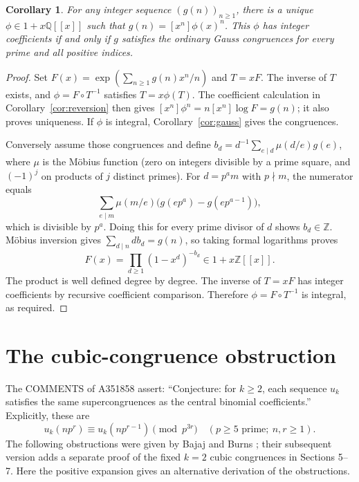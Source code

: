 \documentclass[11pt]{article}
\newtheorem{corollary}[theorem]{Corollary}
\begin{document}
\begin{corollary}\label{cor:criterion}
For any integer sequence $(g(n))_{n\geq1}$, there is a unique
$\phi\in1+x\mathbb Q[[x]]$ such that $g(n)=[x^n]\phi(x)^n$.
This $\phi$ has integer coefficients if and only if $g$ satisfies the
ordinary Gauss congruences for every prime and all positive indices.
\end{corollary}
\begin{proof}
Set $F(x)=\exp(\sum_{n\geq1}g(n)x^n/n)$ and $T=xF$.
The inverse of $T$ exists, and $\phi=F\circ T^{-1}$ satisfies $T=x\phi(T)$.
The coefficient calculation in Corollary~\ref{cor:reversion} then gives
$[x^n]\phi^n=n[x^n]\log F=g(n)$; it also proves uniqueness.
If $\phi$ is integral, Corollary~\ref{cor:gauss} gives the congruences.

Conversely assume those congruences and define
$b_d=d^{-1}\sum_{e\mid d}\mu(d/e)g(e)$, where $\mu$ is the M\"obius
function (zero on integers divisible by a prime square, and $(-1)^j$ on
products of $j$ distinct primes).
For $d=p^a m$ with $p\nmid m$, the numerator equals
\[
 \sum_{e\mid m}\mu(m/e)\bigl(g(ep^a)-g(ep^{a-1})\bigr),
\]
which is divisible by $p^a$. Doing this for every prime divisor of $d$
shows $b_d\in\mathbb Z$. M\"obius inversion gives
$\sum_{d\mid n}d b_d=g(n)$, so taking formal logarithms proves
\[
 F(x)=\prod_{d\geq1}(1-x^d)^{-b_d}\in1+x\mathbb Z[[x]].
\]
The product is well defined degree by degree. The inverse of $T=xF$
has integer coefficients by recursive coefficient comparison. Therefore
$\phi=F\circ T^{-1}$ is integral, as required.
\end{proof}

\section{The cubic-congruence obstruction}
The COMMENTS of A351858 assert: ``Conjecture: for $k\geq2$, each sequence
$u_k$ satisfies the same supercongruences as the central binomial
coefficients.'' Explicitly, these are
\begin{equation}\label{eq:cubic}
 u_k(np^r)\equiv u_k(np^{r-1})\pmod{p^{3r}}
 \quad(p\geq5\text{ prime};\ n,r\geq1).
\end{equation}
The following obstructions were given by Bajaj and Burns
\cite[Sections 2--3]{bbfirst}; their subsequent version \cite{bb} adds
a separate proof of the fixed $k=2$ cubic congruences in Sections 5--7.
Here the positive expansion gives an alternative derivation of the obstructions.
\end{document}
